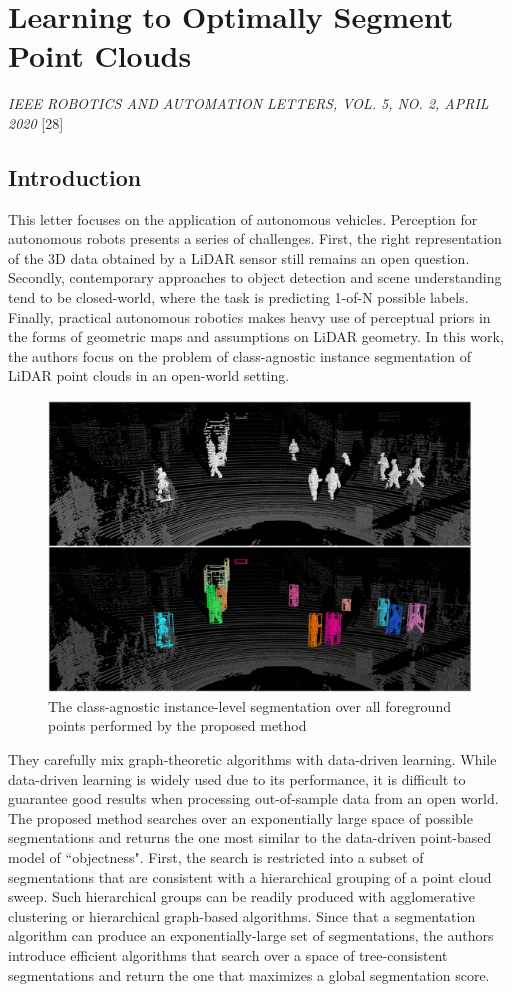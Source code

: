 \section{Learning to Optimally Segment Point Clouds}\label{header-n863}

\emph{IEEE ROBOTICS AND AUTOMATION LETTERS, VOL. 5, NO. 2, APRIL 2020}
{[}28{]}

\subsection{Introduction}\label{header-n865}

This letter focuses on the application of autonomous vehicles.
Perception for autonomous robots presents a series of challenges. First,
the right representation of the 3D data obtained by a LiDAR sensor still
remains an open question. Secondly, contemporary approaches to object
detection and scene understanding tend to be closed-world, where the
task is predicting 1-of-N possible labels. Finally, practical autonomous
robotics makes heavy use of perceptual priors in the forms of geometric
maps and assumptions on LiDAR geometry. In this work, the authors focus
on the problem of class-agnostic instance segmentation of LiDAR point
clouds in an open-world setting.

\begin{figure}[h!]
\centering
\includegraphics[width=0.7\linewidth]{images/pointcloudseg.png}
\caption{The class-agnostic instance-level segmentation over all foreground points performed by the proposed method }
\end{figure}

They carefully mix graph-theoretic algorithms with data-driven learning.
While data-driven learning is widely used due to its performance, it is
difficult to guarantee good results when processing out-of-sample data
from an open world. The proposed method searches over an exponentially
large space of possible segmentations and returns the one most similar
to the data-driven point-based model of ``objectness". First, the search
is restricted into a subset of segmentations that are consistent with a
hierarchical grouping of a point cloud sweep. Such hierarchical groups
can be readily produced with agglomerative clustering or hierarchical
graph-based algorithms. Since that a segmentation algorithm can produce
an exponentially-large set of segmentations, the authors introduce
efficient algorithms that search over a space of tree-consistent
segmentations and return the one that maximizes a global segmentation
score.

